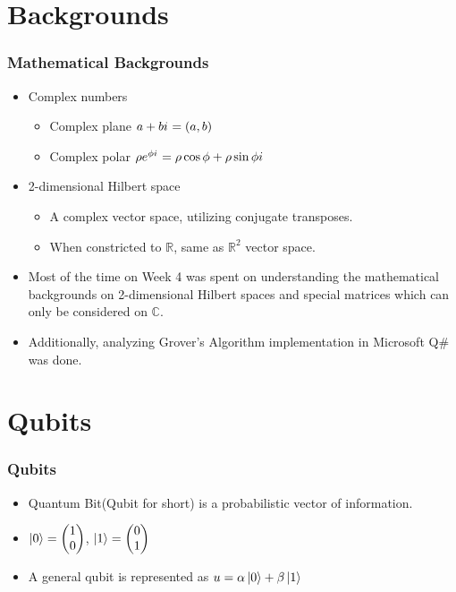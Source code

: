 \documentclass{beamer}
\newcommand{\iu}{{i\mkern1mu}}
\begin{document}
	\section{Backgrounds}
	
	\begin{frame}
		\frametitle{Mathematical Backgrounds}
		\begin{itemize}
			\item Complex numbers
			\begin{itemize}
				\item Complex plane $a+b\iu=(a,b)$
				\item Complex polar $\rho e^{\phi \iu}=\rho \cos \phi + \rho \sin \phi \iu$
			\end{itemize}
			\item 2-dimensional Hilbert space
			\begin{itemize}
				\item A complex vector space, utilizing conjugate transposes.
				\item When constricted to $\mathbb{R}$, same as $\mathbb{R}^2$ vector space.
			\end{itemize}
			\item Most of the time on Week 4 was spent on understanding the mathematical backgrounds on 2-dimensional Hilbert spaces and special matrices which can only be considered on $\mathbb{C}$.
			\item Additionally, analyzing Grover's Algorithm implementation in Microsoft Q\# was done.
		\end{itemize}
	\end{frame}
	
	\section{Qubits}
	\begin{frame}
		\frametitle{Qubits}
		\begin{itemize}
			\item Quantum Bit(Qubit for short) is a probabilistic vector of information.
			\item $\ket{0}=\begin{pmatrix} 1 \\ 0 \end{pmatrix}$, $\ket{1}=\begin{pmatrix} 0 \\ 1 \end{pmatrix}$
			\item A general qubit is represented as $u=\alpha \ket{0}+\beta \ket{1}$
		\end{itemize}
	\end{frame}
	
\end{document}
